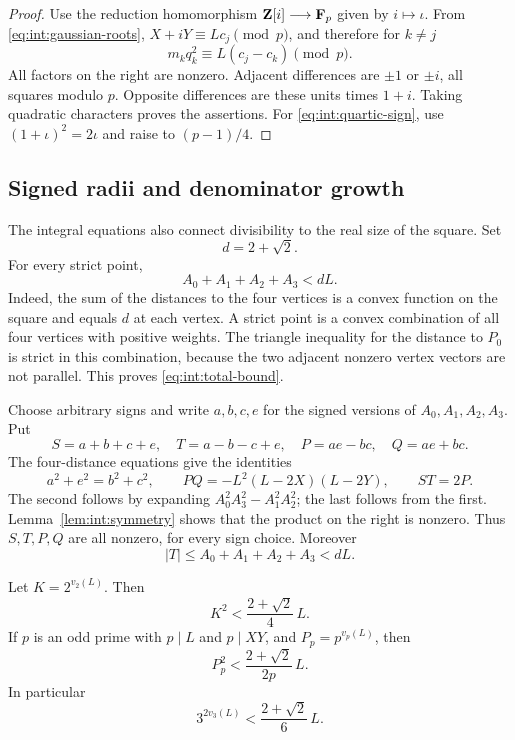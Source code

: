 \begin{proof}
Use the reduction homomorphism $\mathbf Z[i]\longrightarrow\mathbf F_p$ given by
$i\mapsto\iota$. From \eqref{eq:int:gaussian-roots},
$X+iY\equiv Lc_j\pmod p$, and therefore for $k\ne j$
\[
 m_kq_k^2\equiv L(c_j-c_k)\pmod p.
\]
All factors on the right are nonzero. Adjacent differences are
$\pm1$ or $\pm i$, all squares modulo $p$. Opposite differences are
these units times $1+i$. Taking quadratic characters proves the
assertions. For \eqref{eq:int:quartic-sign}, use
$(1+\iota)^2=2\iota$ and raise to $(p-1)/4$.
\end{proof}

\subsection{Signed radii and denominator growth}

The integral equations also connect divisibility to the real size of
the square. Set
\[
 d=2+\sqrt2.
\]
For every strict point,
\begin{equation}\label{eq:int:total-bound}
 A_0+A_1+A_2+A_3<dL.
\end{equation}
Indeed, the sum of the distances to the four vertices is a convex
function on the square and equals $d$ at each vertex. A strict point
is a convex combination of all four vertices with positive weights.
The triangle inequality for the distance to $P_0$ is strict in this
combination, because the two adjacent nonzero vertex vectors are not
parallel. This proves \eqref{eq:int:total-bound}.

Choose arbitrary signs and write $a,b,c,e$ for the signed versions
of $A_0,A_1,A_2,A_3$. Put
\[
 S=a+b+c+e,\quad T=a-b-c+e,\quad
 P=ae-bc,\quad Q=ae+bc.
\]
The four-distance equations give the identities
\begin{equation}\label{eq:int:signed-identities}
 a^2+e^2=b^2+c^2,\qquad
 PQ=-L^2(L-2X)(L-2Y),\qquad ST=2P.
\end{equation}
The second follows by expanding $A_0^2A_3^2-A_1^2A_2^2$;
the last follows from the first. Lemma~\ref{lem:int:symmetry} shows
that the product on the right is nonzero. Thus $S,T,P,Q$ are all
nonzero, for every sign choice. Moreover
\begin{equation}\label{eq:int:signed-bound}
 |T|\le A_0+A_1+A_2+A_3<dL.
\end{equation}

\begin{theorem}\label{thm:int:prime-comparisons}
Let $K=2^{v_2(L)}$. Then
\begin{equation}\label{eq:int:two-bound}
 K^2<\frac{2+\sqrt2}{4}\,L.
\end{equation}
If $p$ is an odd prime with $p\mid L$ and $p\mid XY$, and
$P_p=p^{v_p(L)}$, then
\begin{equation}\label{eq:int:odd-bound}
 P_p^2<\frac{2+\sqrt2}{2p}\,L.
\end{equation}
In particular
\begin{equation}\label{eq:int:three-bound}
 3^{2v_3(L)}<\frac{2+\sqrt2}{6}\,L.
\end{equation}
\end{theorem}

